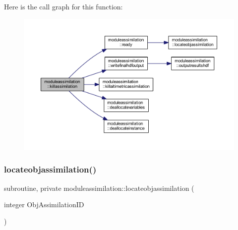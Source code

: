 Here is the call graph for this function\+:\nopagebreak
\begin{figure}[H]
\begin{center}
\leavevmode
\includegraphics[width=350pt]{namespacemoduleassimilation_a3e8d98d577185433d513756aadd846f8_cgraph}
\end{center}
\end{figure}
\mbox{\label{namespacemoduleassimilation_acb3e0bb143f8372bac2b99052ba4943d}} 
\subsubsection{\texorpdfstring{locateobjassimilation()}{locateobjassimilation()}}
{\footnotesize\ttfamily subroutine, private moduleassimilation\+::locateobjassimilation (\begin{DoxyParamCaption}\item[{integer}]{Obj\+Assimilation\+ID }\end{DoxyParamCaption})\hspace{0.3cm}{\ttfamily [private]}}


